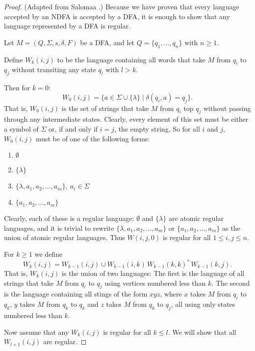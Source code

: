 \documentclass{bcthesis}
\newcommand{\footcite}[2]{\xspace\cite[pg.~{#2}]{#1}\xspace}
\begin{document}
	\begin{proof}
		(Adapted from Salomaa \footcite{salomaa}{29}.)
		Because we have proven that every language accepted by an NDFA is accepted by a DFA, it is enough to show that any language represented by a DFA is regular.

		Let $M = (Q, \Sigma, s, \delta, F)$ be a DFA, and let $Q = \{ q_1, \dots, q_n \}$ with $n \geq 1$.

		Define $W_k(i, j)$ to be the language containing all words that take $M$ from $q_i$ to $q_j$ without transiting any state $q_l$ with $l > k$.

		Then for $k = 0$:
		\[
			W_0(i, j) = \{ a \in \Sigma \cup \{ \lambda \} \mid \delta(q_i, a) = q_j \}.
		\]
		That is, $W_0(i, j)$ is the set of strings that take $M$ from $q_i$ top $q_j$ without passing through any intermediate states.
		Clearly, every element of this set must be either a symbol of $\Sigma$ or, if and only if $i = j$, the empty string.
		So for all $i$ and $j$, $W_0(i, j)$ must be of one of the following forms:
		\begin{enumerate}[label=(\roman*), itemsep = -0.3 ex, nolistsep]
			\item $\emptyset$
			\item $\{ \lambda \}$
			\item $\{ \lambda, a_1, a_2, \dots, a_m \}, \ a_i \in \Sigma$
			\item $\{ a_1, a_2, \dots, a_m \}$
		\end{enumerate}
		Clearly, each of these is a regular language:
		$\emptyset$ and $\{ \lambda \}$ are atomic regular languages, and it is trivial to rewrite $\{ \lambda, a_1, a_2, \dots, a_m \}$ or $\{ a_1, a_2, \dots, a_m \}$ as the union of atomic regular languages.
		Thus $W(i, j, 0)$ is regular for all $1 \leq i, j \leq n$.

		For $k \geq 1$ we define
		\[
			W_k(i, j) = W_{k-1}(i, j) \cup W_{k-1}(i, k)\, W_{k-1}(k, k)^*\, W_{k-1}(k, j).
		\]
		That is, $W_k(i, j)$ is the union of two languages:
		The first is the language of all strings that take $M$ from $q_i$ to $q_j$ using vertices numbered less than $k$.
		The second is the language containing all stings of the form $xyz$, where $x$ takes $M$ from $q_i$ to $q_k$, $y$ takes $M$ from $q_k$ to $q_k$ and $z$ takes $M$ from $q_k$ to $q_j$, all using only states numbered less than $k$.

		Now assume that any $W_k(i, j)$ is regular for all $k \leq l$.
		We will show that all $W_{l+1}(i, j)$ are regular.


\end{proof}
\end{document}
